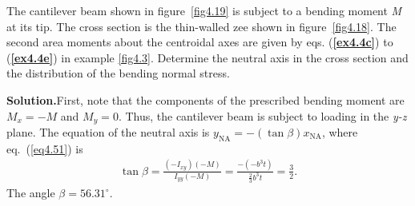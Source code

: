 \documentclass{AeroStructure-ERJohnson}
\begin{document}
\begin{example}\label{ex4.4}\setcounter{equation}{0}\def\theequation{\alph{equation}}%
The cantilever beam shown in figure~\ref{fig4.19} is subject to a bending moment \textit{M} at its tip. The cross section is the thin-walled zee shown in figure~\ref{fig4.18}. The second area moments about the centroidal axes are given by eqs. (\textbf{\ref{ex4.4c}}) to (\textbf{\ref{ex4.4e}}) in example \ref{fig4.3}. Determine the neutral axis in the cross section and the distribution of the bending normal stress.

{\def\thefigure{4.19}
}

\vspace*{-1\baselineskip}
\noindent\textbf{Solution.}\enspace First, note that the components of the prescribed bending moment are $M_{x}=-M$ and $M_{y}=0$. Thus, the cantilever beam is subject to loading in the \textit{y-z} plane. The equation of the neutral axis is $y_{\mathrm{NA}}=-(\tan \beta) x_{\mathrm{NA}}$, where eq.~(\ref{eq4.51}) is
\begin{align}\label{ex4.4a}
\tan \beta=\frac{(-I_{x y})(-M)}{I_{y y}(-M)}=\frac{-(-b^{3} t)}{\displaystyle\frac{2}{3} b^{3} t}=\displaystyle\frac{3}{2}.
\end{align}
The angle $\beta=56.31^{\circ}$.


\end{example}
\end{document}
